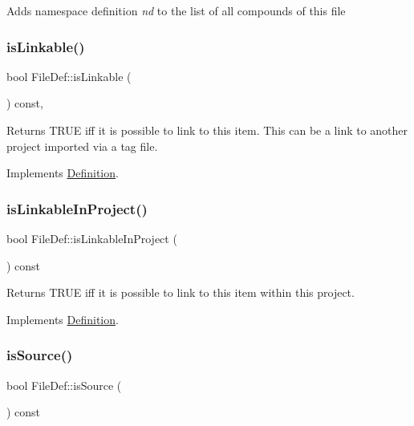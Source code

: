 Adds namespace definition {\itshape nd} to the list of all compounds of this file \mbox{\label{class_file_def_a4d175f205d548fa28fc9c5aed8095aee}} 
\subsubsection{\texorpdfstring{isLinkable()}{isLinkable()}}
{\footnotesize\ttfamily bool File\+Def\+::is\+Linkable (\begin{DoxyParamCaption}{ }\end{DoxyParamCaption}) const\hspace{0.3cm}{\ttfamily [inline]}, {\ttfamily [virtual]}}

Returns T\+R\+UE iff it is possible to link to this item. This can be a link to another project imported via a tag file. 

Implements \mbox{\hyperlink{class_definition_a4002fd79c2d4dcf667c37c83d4214deb}{Definition}}.

\mbox{\label{class_file_def_ad8195d5d5b2be4f11d37e8d75f9e4659}} 
\subsubsection{\texorpdfstring{isLinkableInProject()}{isLinkableInProject()}}
{\footnotesize\ttfamily bool File\+Def\+::is\+Linkable\+In\+Project (\begin{DoxyParamCaption}{ }\end{DoxyParamCaption}) const\hspace{0.3cm}{\ttfamily [virtual]}}

Returns T\+R\+UE iff it is possible to link to this item within this project. 

Implements \mbox{\hyperlink{class_definition_a845891c7206d40c3664b562636cdf9fc}{Definition}}.

\mbox{\label{class_file_def_a0e40f11b7915efcd403a679430d4ac4e}} 
\subsubsection{\texorpdfstring{isSource()}{isSource()}}
{\footnotesize\ttfamily bool File\+Def\+::is\+Source (\begin{DoxyParamCaption}{ }\end{DoxyParamCaption}) const\hspace{0.3cm}{\ttfamily [inline]}}

